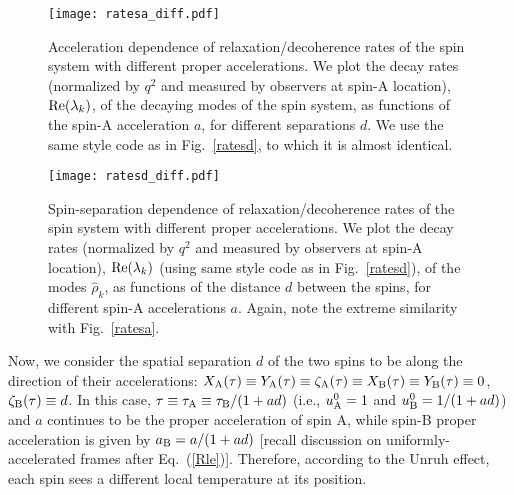 \documentclass[]{nature}
\makeatletter
\renewenvironment{figure*}
               {\@dblfloat{figure}}
               {\end@dblfloat}
\makeatother
\begin{document}
{\begin{figure*}
 \texttt{[image: ratesa\_diff.pdf]}
\caption{
Acceleration dependence of relaxation/decoherence rates of the spin system with different proper accelerations.
We plot the decay rates (normalized by $q^2$ and measured by observers at spin-A location),  
${\rm Re}(\lambda_k)$, of the decaying modes of the spin system,
as functions of the spin-A acceleration $a$, for different separations $d$. We use the same style code as in Fig.~\ref{ratesd}, to which it is almost identical.}
\label{ratesdd}
\end{figure*}
\begin{figure*}
 \texttt{[image: ratesd\_diff.pdf]}
\caption{
Spin-separation dependence of relaxation/decoherence rates of the spin system with different proper accelerations.
We plot the decay rates (normalized by $q^2$ and measured by observers at spin-A location),  ${\rm Re}(\lambda_k)$ (using same style code as in Fig.~\ref{ratesd}), of the modes $\hat\rho_k$,
as functions of the distance  $d$ between the spins, for different spin-A accelerations $a$. 
Again, note the extreme similarity with Fig.~\ref{ratesa}.}
\label{ratesad}
\end{figure*}

Now, we consider the spatial separation $d$ of the two spins to be along the direction of their accelerations:
$X_{\rm A}(\tau) \equiv Y_{\rm A}(\tau)\equiv \zeta_{\rm A}(\tau)\equiv X_{\rm B}(\tau)  \equiv Y_{\rm B}(\tau) \equiv 0$, $\zeta_{\rm B} (\tau)\equiv d$. 
In this case, $\tau \equiv \tau_{\rm A} \equiv \tau_{\rm B}/(1+ad)$  (i.e., $u_{\rm A}^0 = 1$ and $ u_{\rm B}^0 = 1/(1+ad)$) and $a$ 
continues to be the proper acceleration 
of spin A, while spin-B proper acceleration is given by
$a_{\rm B} = a/(1+ad)$ [recall discussion on uniformly-accelerated frames after
Eq.~(\ref{Rle})]. Therefore, according to the Unruh effect, each spin sees a different local temperature
at its position.

}
\end{document}
